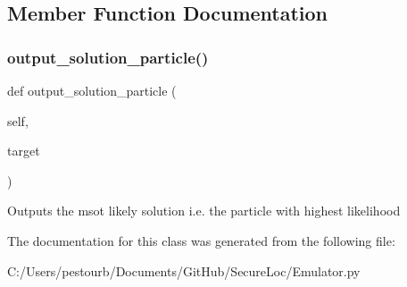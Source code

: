 \subsection{Member Function Documentation}
\mbox{\label{class_emulator_1_1_i_p_s_abe450fd9913862afeb368a8eff426c13}} 
\subsubsection{\texorpdfstring{output\+\_\+solution\+\_\+particle()}{output\_solution\_particle()}}
{\footnotesize\ttfamily def output\+\_\+solution\+\_\+particle (\begin{DoxyParamCaption}\item[{}]{self,  }\item[{}]{target }\end{DoxyParamCaption})}

\begin{DoxyVerb}Outputs the msot likely solution i.e. the particle with highest likelihood\end{DoxyVerb}
 

The documentation for this class was generated from the following file\+:\begin{DoxyCompactItemize}
\item 
C\+:/\+Users/pestourb/\+Documents/\+Git\+Hub/\+Secure\+Loc/Emulator.\+py\end{DoxyCompactItemize}
